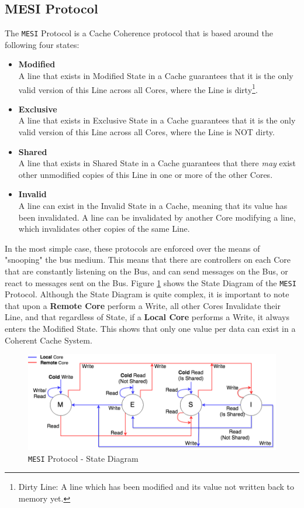 \documentclass[bsc,frontabs,twoside,singlespacing,parskip,deptreport]{infthesis}     %
\begin{document}
\subsection{MESI Protocol}\label{sec:mesi-protocol}
The \texttt{MESI} Protocol is a Cache Coherence protocol that is based around the following four states:
\begin{itemize}
    \item \textbf{Modified} \\
    A line that exists in Modified State in a Cache guarantees that it is the only valid version of this Line across all Cores, where the Line is dirty\footnote{Dirty Line: A line which has been modified and its value not written back to memory yet.}.
    \item \textbf{Exclusive} \\
    A line that exists in Exclusive State in a Cache guarantees that it is the only valid version of this Line across all Cores, where the Line is NOT dirty.
    \item \textbf{Shared} \\
    A line that exists in Shared State in a Cache guarantees that there \emph{may} exist other unmodified copies of this Line in one or more of the other Cores.
    \item \textbf{Invalid} \\
    A line can exist in the Invalid State in a Cache, meaning that its value has been invalidated. A line can be invalidated by another Core modifying a line, which invalidates other copies of the same Line.
\end{itemize}
In the most simple case, these protocols are enforced over the means of "snooping" the bus medium. This means that there are controllers on each Core that are constantly listening on the Bus, and can send messages on the Bus, or react to messages sent on the Bus. Figure \ref{fig:mesi-state} shows the State Diagram of the \texttt{MESI} Protocol. Although the State Diagram is quite complex, it is important to note that upon a \textbf{Remote Core} perform a Write, all other Cores Invalidate their Line, and that regardless of State, if a \textbf{Local Core} performs a Write, it always enters the Modified State. This shows that only one value per data can exist in a Coherent Cache System. 

\begin{figure}[!h]
    \centering
    \includegraphics[width=15cm]{MESI.png}
    \caption{\texttt{MESI} Protocol - State Diagram}
    \label{fig:mesi-state}
\end{figure}
\end{document}
